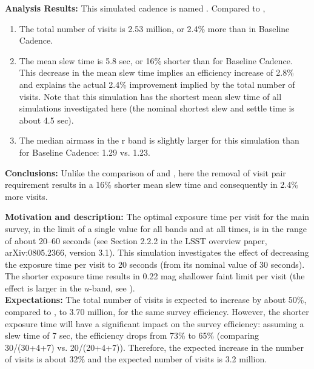 {\bf Analysis Results:}  This simulated cadence is named
. Compared to ,
\begin{enumerate}
\item The total number of visits is 2.53 million, or 2.4\% more than
in Baseline Cadence.
\item The mean slew time is 5.8 sec, or 16\% shorter than for Baseline
Cadence. This decrease in the mean slew time implies an efficiency
increase of 2.8\% and explains the actual 2.4\% improvement implied by
the total number of visits.  Note that this simulation has the
shortest mean slew time of all simulations investigated here (the
nominal shortest slew and settle time is about 4.5 sec).
\item The median airmass in the r band is slightly larger for this
simulation than for Baseline Cadence: 1.29 vs. 1.23.
\end{enumerate}


{\bf Conclusions:}
Unlike the comparison of  and
, here the removal of visit pair requirement
results in a 16\% shorter mean slew time and consequently in 2.4\%
more visits.



{\bf Motivation and description:} The optimal exposure time per visit
for the main survey, in the limit of a single value for all bands and
at all times, is in the range of about 20--60 seconds (see Section
2.2.2 in the LSST overview paper, arXiv:0805.2366, version 3.1). This
simulation investigates the effect of decreasing the exposure time per
visit to 20 seconds (from its nominal value of 30 seconds). The
shorter exposure time results in 0.22 mag shallower faint limit per
visit (the effect is larger in the $u$-band, see
). \\

{\bf Expectations:} The total number of visits is expected to increase
by about 50\%, compared to , to 3.70 million,
for the same survey efficiency. However, the shorter exposure time
will have a significant impact on the survey efficiency: assuming a
slew time of 7 sec, the efficiency drops from 73\% to 65\% (comparing
30/(30+4+7) vs. 20/(20+4+7)). Therefore, the expected increase in the
number of visits is about 32\% and the expected number of visits is
3.2 million.  \\

